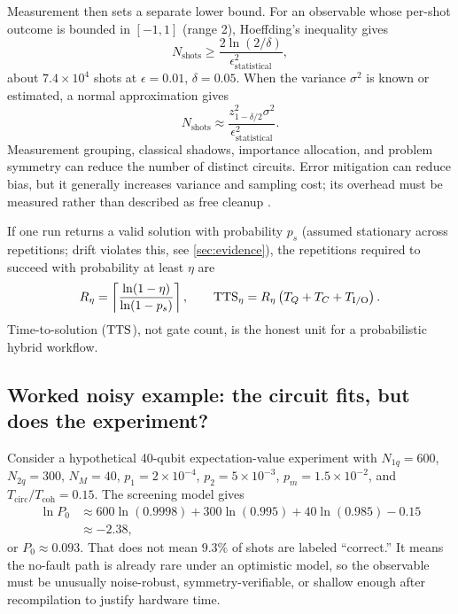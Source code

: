 Measurement then sets a separate lower bound. For an observable whose per-shot outcome is bounded in $[-1,1]$ (range 2), Hoeffding's inequality gives
\begin{equation}
N_{\mathrm{shots}}
\geq \frac{2\ln(2/\delta)}{\epsilon_{\mathrm{statistical}}^2},
\label{eq:hoeffding}
\end{equation}
about $7.4\times10^{4}$ shots at $\epsilon=0.01$, $\delta=0.05$. When the variance $\sigma^2$ is known or estimated, a normal approximation gives
\begin{equation}
N_{\mathrm{shots}}\approx
\frac{z_{1-\delta/2}^{2}\sigma^2}{\epsilon_{\mathrm{statistical}}^2}.
\end{equation}
Measurement grouping, classical shadows, importance allocation, and problem symmetry can reduce the number of distinct circuits. Error mitigation can reduce bias, but it generally increases variance and sampling cost; its overhead must be measured rather than described as free cleanup \citep{cai2023,quek2024}.

If one run returns a valid solution with probability $p_s$ (assumed stationary across repetitions; drift violates this, see \cref{sec:evidence}), the repetitions required to succeed with probability at least $\eta$ are
\begin{equation}
R_{\eta}=\left\lceil
\frac{\ln(1-\eta)}{\ln(1-p_s)}
\right\rceil,
\qquad
\operatorname{TTS}_{\eta}=R_{\eta}
\left(T_Q+T_C+T_{\mathrm{I/O}}\right).
\label{eq:tts}
\end{equation}
Time-to-solution ($\operatorname{TTS}$), not gate count, is the honest unit for a probabilistic hybrid workflow.

\subsection{Worked noisy example: the circuit fits, but does the experiment?}

Consider a hypothetical 40-qubit expectation-value experiment with $N_{1q}=600$, $N_{2q}=300$, $N_M=40$, $p_1=2\times10^{-4}$, $p_2=5\times10^{-3}$, $p_m=1.5\times10^{-2}$, and $T_{\mathrm{circ}}/T_{\mathrm{coh}}=0.15$. The screening model gives
\begin{align}
\ln P_0 &\approx 600\ln(0.9998)+300\ln(0.995)
+40\ln(0.985)-0.15\\
&\approx -2.38,
\end{align}
or $P_0\approx 0.093$. That does not mean $9.3\%$ of shots are labeled ``correct.'' It means the no-fault path is already rare under an optimistic model, so the observable must be unusually noise-robust, symmetry-verifiable, or shallow enough after recompilation to justify hardware time.

